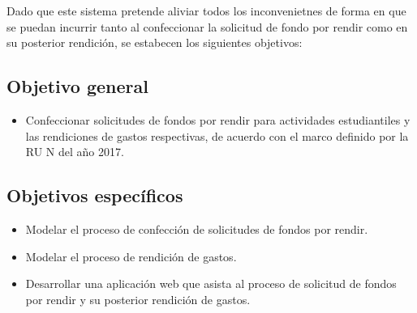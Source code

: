 Dado que este sistema pretende aliviar todos los inconvenietnes de forma en que se puedan incurrir tanto al confeccionar la solicitud de fondo por rendir como en su posterior rendición, se estabecen los siguientes objetivos:

\subsection{Objetivo general}
    \begin{itemize}
        \item Confeccionar solicitudes de fondos por rendir para actividades estudiantiles y las rendiciones de gastos respectivas, de acuerdo con el marco definido por la RU N del año 2017.
    \end{itemize}

\subsection{Objetivos específicos} 
    \begin{itemize}
        \item Modelar el proceso de confección de solicitudes de fondos por rendir.

        \item Modelar el proceso de rendición de gastos.

        \item Desarrollar una aplicación web que asista al proceso de solicitud de fondos por rendir y su posterior rendición de gastos.

    \end{itemize}

